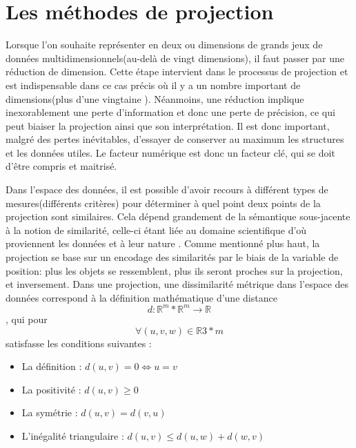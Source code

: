 \section{Les méthodes de projection}

Lorsque l'on souhaite représenter en deux ou  dimensions de grands jeux de données multidimensionnels(au-delà de vingt dimensions\cite{dzemyda2016big}\cite{HeulotThese}), il faut passer par une réduction de dimension. 
Cette étape intervient dans le processus de projection et est indispensable dans ce cas précis où il y a un nombre important de dimensions(plus d'une vingtaine \cite{HeulotThese}). 
Néanmoins, une réduction implique inexorablement une perte d’information et donc une perte de précision, ce qui peut biaiser la projection ainsi que son interprétation. Il est donc important, malgré des pertes inévitables, d'essayer de conserver au maximum les structures et les données utiles.
Le facteur numérique est donc un facteur clé, qui se doit d’être compris et maitrisé. 
\smallskip

Dans l'espace des données, il est possible d’avoir recours à différent types de mesures(différents critères) pour déterminer à quel point deux points de la projection sont similaires. 
Cela dépend grandement de la sémantique sous-jacente à la notion de similarité, celle-ci étant liée au domaine scientifique d’où proviennent les données et à leur nature \cite{HeulotThese}.
Comme mentionné plus haut, la projection se base sur un encodage des similarités par le biais de la variable de position: plus les objets se ressemblent, plus ils seront proches sur la projection, et inversement.
Dans une projection, une dissimilarité métrique dans l’espace des données correspond à la définition mathématique d’une distance \cite{somorjai2011Dissimilarity} \cite{HeulotThese} \newline
 \[d : \mathbb{R}^{m} * \mathbb{R}^{m} \rightarrow \mathbb{R} \] \newline
, qui pour \[\forall (u,v,w) \in \mathbb{R}{3*m}\] satisfasse les conditions suivantes \cite{HeulotThese} : 
\begin{itemize}
    \item La définition : $d(u,v) = 0 \Leftrightarrow u =v$
    \item La positivité : $d(u,v)  \geq 0$
    \item La symétrie : $d(u,v) = d(v,u)$
    \item L'inégalité triangulaire : $d(u,v) \leq d(u,w) + d(w,v)$
\end{itemize}

